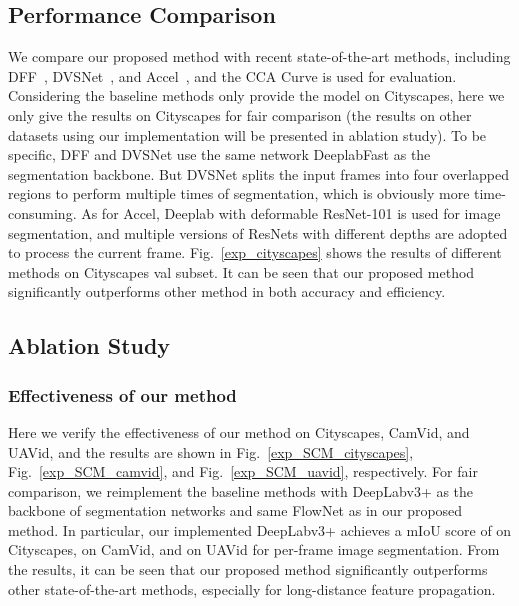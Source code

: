 \documentclass[journal]{IEEEtran}
\begin{document}
\subsection{Performance Comparison}

We compare our proposed method with recent state-of-the-art methods, including DFF~\cite{zhu2017deep}, DVSNet~\cite{xu2018dynamic}, and Accel~\cite{jain2019accel}, and the CCA Curve is used for evaluation. 
Considering the baseline methods only provide the model on Cityscapes, here we only give the results on Cityscapes for fair comparison (the results on other datasets using our implementation will be presented in ablation study). To be specific, DFF and DVSNet use the same network DeeplabFast  as the segmentation backbone. But DVSNet splits the input frames into four overlapped regions to perform multiple times of segmentation, which is obviously more time-consuming. As for Accel, Deeplab with deformable ResNet-101 is used for image segmentation, and multiple versions of ResNets with different depths are adopted to process the current frame. Fig.~\ref{exp_cityscapes} shows the results of different methods on Cityscapes val subset. It can be seen that our proposed method significantly outperforms other method in both accuracy and efficiency. 

\subsection{Ablation Study}

\subsubsection{Effectiveness of our method}

Here we verify the effectiveness of our method on Cityscapes, CamVid, and UAVid, and the results are shown in Fig.~\ref{exp_SCM_cityscapes}, Fig.~\ref{exp_SCM_camvid}, and Fig.~\ref{exp_SCM_uavid}, respectively. For fair comparison, we reimplement the baseline methods with DeepLabv3+ as the backbone of segmentation networks and same FlowNet as in our proposed method. In particular, our implemented DeepLabv3+ achieves a mIoU score of  on Cityscapes,  on CamVid, and  on UAVid for per-frame image segmentation. From the results, it can be seen that our proposed method significantly outperforms other state-of-the-art methods, especially for long-distance feature propagation. 
\end{document}
